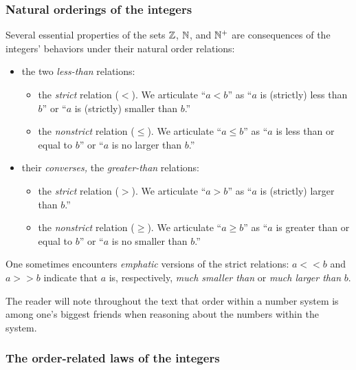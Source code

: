 \subsubsection{Natural orderings of the integers}
\label{sec:natural-orderings}

Several essential properties of the sets $\mathbb{Z}$, $\mathbb{N}$, and $\mathbb{N}^+$ are
consequences of the integers' behaviors under their natural order
relations:
\begin{itemize}
\item
the two {\em less-than} relations:
  \begin{itemize}
  \item
the {\em strict} relation ($<$).  We articulate ``$a < b$'' as ``$a$
is (strictly) less than $b$'' or ``$a$ is (strictly) smaller than
$b$.''
  \item
the {\em nonstrict} relation ($\leq$).  We articulate ``$a \leq b$''
as ``$a$ is less than or equal to $b$'' or ``$a$ is no larger than
$b$.''
  \end{itemize}
 

\item
their {\em converses,} the {\em greater-than} relations:
  \begin{itemize}
  \item
the {\em strict} relation ($>$).  We articulate ``$a > b$'' as ``$a$
is (strictly) larger than $b$.''
  \item
the {\em nonstrict} relation ($\geq$).  We articulate ``$a \geq b$''
as ``$a$ is greater than or equal to $b$'' or ``$a$ is no smaller than
$b$.''
  \end{itemize}
\end{itemize}
One sometimes encounters {\em emphatic} versions of the strict
relations: $a << b$ and $a >> b$ indicate that $a$ is, respectively,
{\em much smaller than} or {\em much larger than} $b$.

The reader will note throughout the text that order within a number
system is among one's biggest friends when reasoning about the numbers
within the system.  

\subsubsection{The order-related laws of the integers}
\label{sec:order-laws}

